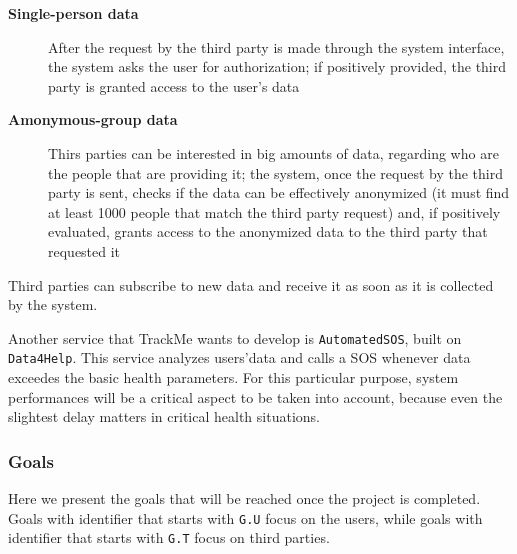 \documentclass[12pt]{article}
\begin{document}
        \begin{description}
          \item [\textbf{Single-person data}] After the request by the third party is made through the system interface, the system asks the user for authorization; if positively provided, the third party is granted access to the user's data
          \item [\textbf{Amonymous-group data}] Thirs parties can be interested in big amounts of data, regarding who are the people that are providing it; the system, once the request by the third party is sent, checks if the data can be effectively anonymized (it must find at least 1000 people that match the third party request) and, if positively evaluated, grants access to the anonymized data to the third party that requested it
        \end{description}

        Third parties can subscribe to new data and receive it as soon as it is collected by the system.

        Another service that TrackMe wants to develop is \texttt{AutomatedSOS}, built on \texttt{Data4Help}. This service analyzes users'data and calls a SOS whenever data exceedes the basic health parameters. For this particular purpose, system performances will be a critical aspect to be taken into account, because even the slightest delay matters in critical health situations.

      \subsubsection{Goals}

        Here we present the goals that will be reached once the project is completed. Goals with identifier that starts with \texttt{G.U} focus on the users, while goals with identifier that starts with \texttt{G.T} focus on third parties.

\end{document}
